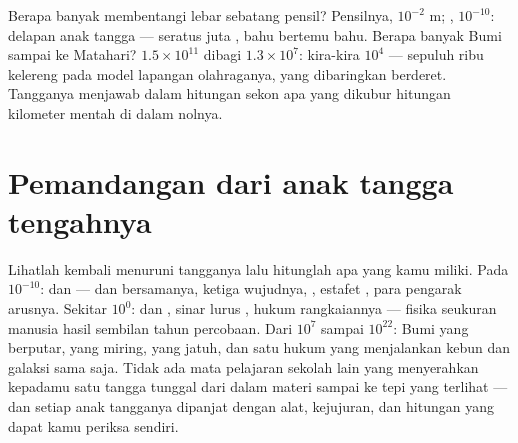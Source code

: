\begin{example}\label{ex:g9:atoms-to-galaxies:arithmetic}
Berapa banyak  membentangi lebar sebatang pensil? Pensilnya,
$10^{-2}$ \unit{m}; , $10^{-10}$: delapan anak tangga ---
seratus juta , bahu bertemu bahu. Berapa banyak Bumi sampai ke
Matahari? $1.5 \times 10^{11}$ dibagi $1.3 \times 10^{7}$: kira-kira
$10^{4}$ --- sepuluh ribu kelereng pada model lapangan olahraganya,
yang dibaringkan berderet. Tangganya menjawab dalam hitungan sekon apa
yang dikubur hitungan kilometer mentah di dalam nolnya.
\end{example}

\section{Pemandangan dari anak tangga tengahnya}

\begin{remark}\label{rem:g9:atoms-to-galaxies:built}
Lihatlah kembali menuruni tangganya lalu hitunglah apa yang kamu
miliki. Pada $10^{-10}$:  dan  --- dan bersamanya, ketiga
wujudnya, , estafet , para pengarak arusnya. Sekitar
$10^{0}$:  dan , sinar lurus , hukum rangkaiannya
--- fisika seukuran manusia hasil sembilan tahun percobaan. Dari
$10^{7}$ sampai $10^{22}$: Bumi yang berputar,  yang miring,
 yang jatuh, dan satu hukum  yang menjalankan kebun dan
galaksi sama saja. Tidak ada mata pelajaran sekolah lain yang
menyerahkan kepadamu satu tangga tunggal dari dalam materi sampai ke
tepi yang terlihat --- dan setiap anak tangganya dipanjat dengan alat,
kejujuran, dan hitungan yang dapat kamu periksa sendiri.
\end{remark}

